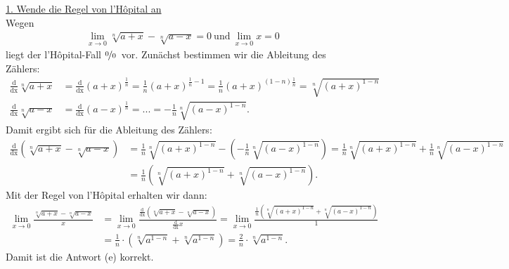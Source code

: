 \underline{1. Wende die Regel von l'H\^{o}pital an}\\
Wegen
\begin{align*}
	\lim \limits_{x \to 0} \sqrt[n]{a+x} - \sqrt[n]{a-x} = 0
	\ \textrm{und} \
	\lim \limits_{x \to 0} x = 0
\end{align*}
liegt der l'H\^{o}pital-Fall \glqq$ \nicefrac{0}{0} $\grqq~vor.
Zunächst bestimmen wir die Ableitung des Zählers:
\begin{align*}
	\frac{\mathrm{d}}{ \mathrm{dx} }\sqrt[n]{a+x}
	&=
	\frac{\mathrm{d}}{\mathrm{dx} }(a+x)^{\frac{1}{n}}
	=
	\frac{1}{n}(a+x)^{\frac{1}{n} -1}
	= 
	\frac{1}{n}(a+x)^{\left(1 - n\right) \frac{1}{n} }
	=
	\sqrt[n]{(a+x)^{1 - n }}\\
	\frac{\mathrm{d}}{\mathrm{dx} }\sqrt[n]{a-x}
	&=
	\frac{\mathrm{d}}{\mathrm{dx} }(a-x)^{\frac{1}{n}}
	=
	...
	=
	-\frac{1}{n}\sqrt[n]{(a-x)^{1 - n }}.
\end{align*}
Damit ergibt sich für die Ableitung des Zählers:
\begin{align*}
		\frac{\mathrm{d}}{ \mathrm{dx} } \left(\sqrt[n]{a+x} - \sqrt[n]{a-x} \right)
		&=
		\frac{1}{n}\sqrt[n]{(a+x)^{1 - n }} -\left(-\frac{1}{n}\sqrt[n]{(a-x)^{1 - n }}\right)
		=
		\frac{1}{n}\sqrt[n]{(a+x)^{1 - n }} +\frac{1}{n}\sqrt[n]{(a-x)^{1 - n }}\\
		&=
		\frac{1}{n}
		\left(\sqrt[n]{(a+x)^{1 - n }}+\sqrt[n]{(a-x)^{1 - n }}\right).
\end{align*}
Mit der Regel von l'H\^{o}pital erhalten wir dann:
\begin{align*}
	\lim \limits_{x \to 0}
	\frac{\sqrt[n]{a+x} - \sqrt[n]{a-x}}{x}
	&=
	\lim \limits_{x \to 0}
	\frac{\frac{\mathrm{d}}{ \mathrm{dx} } \left(\sqrt[n]{a+x} - \sqrt[n]{a-x} \right)}{ \frac{\mathrm{d}}{ \mathrm{dx} }  x}
	=
	\lim \limits_{x \to 0}
	\frac{\frac{1}{n}
		\left(\sqrt[n]{(a+x)^{1 - n }}+\sqrt[n]{(a-x)^{1 - n }}\right)}{1}\\
	&=\frac{1}{n}\cdot
	\left(\sqrt[n]{a^{1 - n }} + \sqrt[n]{a^{1 - n }}\right)
	=
	\frac{2}{n} \cdot \sqrt[n]{a^{1 - n }}.
\end{align*}
Damit ist die Antwort (e) korrekt.


\newpage
